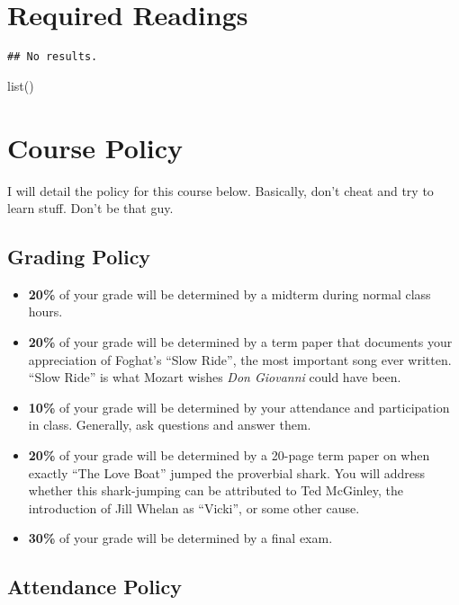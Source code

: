 \documentclass[
      12pt,
        ]{article}
\begin{document}
\hypertarget{required-readings}{%
\section{Required Readings}\label{required-readings}}

\begin{verbatim}
## No results.
\end{verbatim}

list()

\hypertarget{course-policy}{%
\section{Course Policy}\label{course-policy}}

I will detail the policy for this course below. Basically, don't cheat
and try to learn stuff. Don't be that guy.

\hypertarget{grading-policy}{%
\subsection{Grading Policy}\label{grading-policy}}

\begin{itemize}
\item
  \textbf{20\%} of your grade will be determined by a midterm during
  normal class hours.
\item
  \textbf{20\%} of your grade will be determined by a term paper that
  documents your appreciation of Foghat's ``Slow Ride'', the most
  important song ever written. ``Slow Ride'' is what Mozart wishes
  \emph{Don Giovanni} could have been.
\item
  \textbf{10\%} of your grade will be determined by your attendance and
  participation in class. Generally, ask questions and answer them.
\item
  \textbf{20\%} of your grade will be determined by a 20-page term paper
  on when exactly ``The Love Boat'' jumped the proverbial shark. You
  will address whether this shark-jumping can be attributed to Ted
  McGinley, the introduction of Jill Whelan as ``Vicki'', or some other
  cause.
\item
  \textbf{30\%} of your grade will be determined by a final exam.
\end{itemize}

\hypertarget{attendance-policy}{%
\subsection{Attendance Policy}\label{attendance-policy}}
\end{document}
